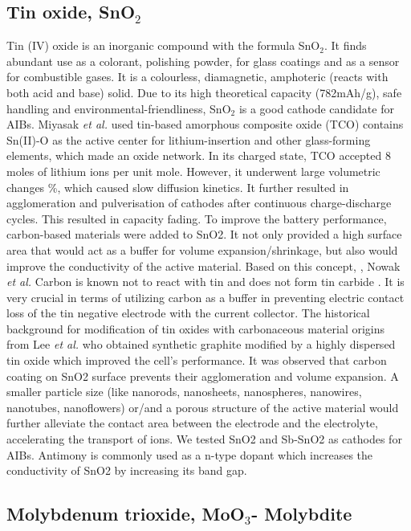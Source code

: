 \subsection{Tin oxide, SnO$_2$}
Tin (IV) oxide is an inorganic compound with the formula SnO$_2$. It finds abundant use as a colorant, polishing powder, for glass coatings and as a sensor for combustible gases. It is a colourless, diamagnetic, amphoteric (reacts with both acid and base) solid. Due to its high theoretical capacity (\approx782mAh/g), safe handling and environmental-friendliness, SnO$_2$ is a good cathode candidate for AIBs. Miyasak \textit{et al.}\cite{} used tin-based amorphous composite oxide (TCO) contains Sn(II)-O as the active center for lithium-insertion and other glass-forming elements, which made an oxide network. In its charged state, TCO accepted 8 moles of lithium ions per unit mole. However, it underwent large volumetric changes \%, which caused slow diffusion kinetics. It further resulted in agglomeration and pulverisation of cathodes after continuous charge-discharge cycles. This resulted in capacity fading. To improve the battery performance, carbon-based materials were added to SnO2. It not only provided a high surface area that would act as a buffer for volume expansion/shrinkage, but also would improve the conductivity of the active material. Based on this concept, \cite{}, Nowak \textit{et al.} 
Carbon is known not to react with tin and does not form tin carbide \cite{}. It is very crucial in terms of utilizing carbon as a buffer in preventing electric contact loss of the tin negative electrode with the current collector\cite{}. The historical background for modification of tin oxides with carbonaceous material origins from Lee \textit{et al.}\cite{} who obtained synthetic graphite modified by a highly dispersed tin oxide \cite{} which improved the cell's performance. 
It was observed that carbon coating on SnO2 surface prevents their agglomeration and volume expansion. A smaller particle size (like nanorods\cite{}, nanosheets\cite{}, nanospheres\cite{}, nanowires\cite{}, nanotubes\cite{}, nanoflowers\cite{}) or/and a porous structure of the active material would further alleviate the contact area between the electrode and the electrolyte, accelerating the transport of ions. 
We tested SnO2 and Sb-SnO2 as cathodes for AIBs. Antimony is commonly used as a n-type dopant which increases the conductivity of SnO2 by increasing its band gap. 
\subsection{Molybdenum trioxide, MoO$_3$- Molybdite}
